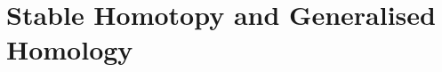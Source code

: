 \documentclass[../main]{subfiles}
\begin{document}
\part{Stable Homotopy and Generalised Homology}\label{part:p3}
\newrefsection


















\printbibliography
\end{document}

